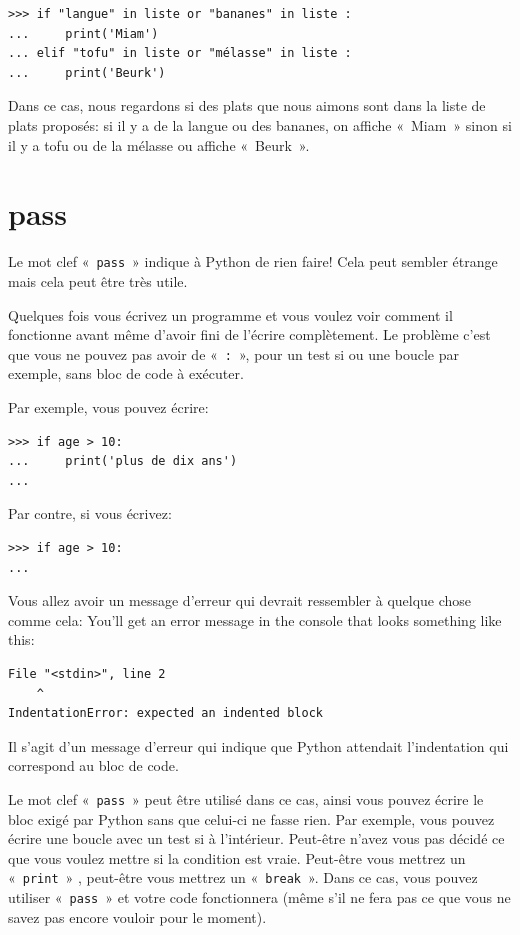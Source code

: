 \begin{Verbatim}[frame=single,rulecolor=\color{gray}]
>>> if "langue" in liste or "bananes" in liste :
...     print('Miam')
... elif "tofu" in liste or "mélasse" in liste :
...     print('Beurk')
\end{Verbatim}

Dans ce cas, nous regardons si des plats que nous aimons sont dans la liste de plats proposés: si il y a de la langue ou des bananes, on affiche « Miam » sinon si il y a tofu ou de la mélasse ou affiche « Beurk ».


\section*{pass}

Le mot clef « \texttt{pass} » indique à Python de rien faire! Cela peut sembler étrange mais cela peut être très utile. 

Quelques fois vous écrivez un programme et vous voulez voir comment il fonctionne avant même d'avoir  fini de l'écrire complètement. Le problème c'est que vous ne pouvez pas avoir de « \texttt{:} », pour un test si ou une boucle par exemple, sans bloc de code à exécuter.

Par exemple, vous pouvez écrire:
\begin{Verbatim}[frame=single,rulecolor=\color{gray}]
>>> if age > 10:
...     print('plus de dix ans')
...
\end{Verbatim}

Par contre, si vous écrivez:
\begin{Verbatim}[frame=single,rulecolor=\color{gray}]
>>> if age > 10:
...
\end{Verbatim}
Vous allez avoir un message d'erreur qui devrait ressembler à quelque chose comme cela:
\noindent
You'll get an error message in the console that looks something like this:

\begin{Verbatim}[frame=single,rulecolor=\color{gray}]
  File "<stdin>", line 2
    ^
IndentationError: expected an indented block
\end{Verbatim}

Il s'agit d'un message d'erreur qui indique que Python attendait l'indentation qui correspond au bloc de code.

Le mot clef « \texttt{pass} » peut être utilisé dans ce cas, ainsi vous pouvez écrire le bloc exigé par Python sans que celui-ci ne fasse rien.
Par exemple, vous pouvez écrire une boucle avec un test si à l'intérieur. Peut-être n'avez vous pas décidé ce que vous voulez mettre si la condition est vraie. Peut-être vous mettrez un « \texttt{print} » , peut-être vous mettrez un « \texttt{break} ». Dans ce cas, vous pouvez utiliser « \texttt{pass} » et votre code fonctionnera (même s'il ne fera pas ce que vous ne savez pas encore vouloir pour le moment).

